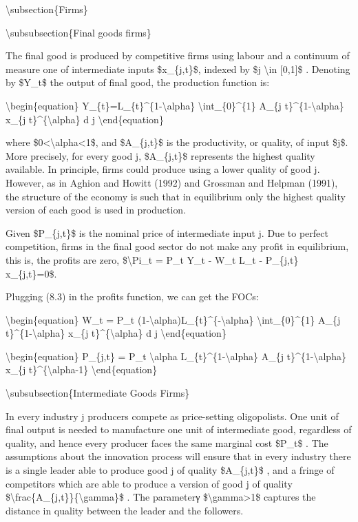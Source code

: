 \documentclass[10pt,math=newtx,citestyle=gb7714-2015,bibstyle=gb7714-2015]{elegantbook}
\begin{document}
	\textbackslash{}subsection\{Firms\}
	
	\textbackslash{}subsubsection\{Final goods firms\}
	
	The final good is produced by competitive firms using labour and a continuum of measure one of intermediate inputs \$x\_\{j,t\}\$, indexed by \$j \textbackslash{}in [0,1]\$ . Denoting by \$Y\_t\$ the output of final good, the production function is:
	
	\textbackslash{}begin\{equation\}
	Y\_\{t\}=L\_\{t\}\^{}\{1-\textbackslash{}alpha\} \textbackslash{}int\_\{0\}\^{}\{1\} A\_\{j t\}\^{}\{1-\textbackslash{}alpha\} x\_\{j t\}\^{}\{\textbackslash{}alpha\} d j
	\textbackslash{}end\{equation\}
	
	where \$0<\textbackslash{}alpha<1\$, and \$A\_\{j,t\}\$ is the productivity, or quality, of input \$j\$. More precisely, for every good j, \$A\_\{j,t\}\$ represents the highest quality available. In principle, firms could produce using a lower quality of good j. However, as in Aghion and Howitt (1992) and Grossman and Helpman (1991), the structure of the economy is such that in equilibrium only the highest quality version of each good is used in production.
	
	Given \$P\_\{j,t\}\$ is the nominal price of intermediate input j. Due to perfect competition, firms in the final good sector do not make any profit in equilibrium, this is, the profits are zero, \$\textbackslash{}Pi\_t = P\_t Y\_t - W\_t L\_t - P\_\{j,t\} x\_\{j,t\}=0\$.
	
	Plugging (8.3) in the profits function, we can get the FOCs:
	
	\textbackslash{}begin\{equation\}
	W\_t = P\_t (1-\textbackslash{}alpha)L\_\{t\}\^{}\{-\textbackslash{}alpha\} \textbackslash{}int\_\{0\}\^{}\{1\} A\_\{j t\}\^{}\{1-\textbackslash{}alpha\} x\_\{j t\}\^{}\{\textbackslash{}alpha\} d j
	\textbackslash{}end\{equation\}
	
	\textbackslash{}begin\{equation\}
	P\_\{j,t\} = P\_t \textbackslash{}alpha L\_\{t\}\^{}\{1-\textbackslash{}alpha\} A\_\{j t\}\^{}\{1-\textbackslash{}alpha\} x\_\{j t\}\^{}\{\textbackslash{}alpha-1\}
	\textbackslash{}end\{equation\}
	
	\textbackslash{}subsubsection\{Intermediate Goods Firms\}
	
	In every industry j producers compete as price-setting oligopolists. One unit of final output is needed to manufacture one unit of intermediate good, regardless of quality, and hence every producer faces the same marginal cost \$P\_t\$ . The assumptions about the innovation process will ensure that in every industry there is a single leader able to produce good j of quality \$A\_\{j,t\}\$ , and a fringe of competitors which are able to produce a version of good j of quality \$\textbackslash{}frac\{A\_\{j,t\}\}\{\textbackslash{}gamma\}\$ . The parameterγ \$\textbackslash{}gamma>1\$ captures the distance in quality between the leader and the followers.
	
\end{document}
